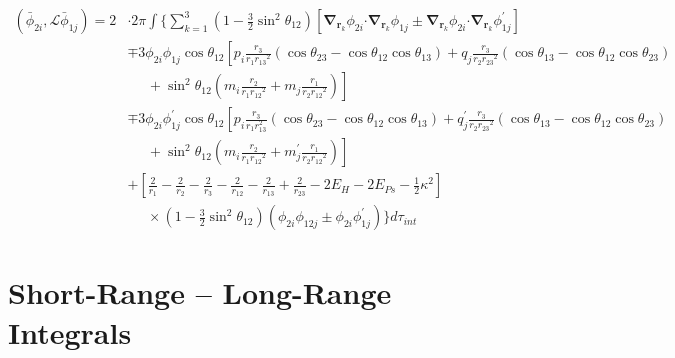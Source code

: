 \documentclass[Dissertation.tex]{subfiles}
\begin{document}
\begin{align}
\label{eq:DWavePhi2Phi1}
\left(\bar{\phi}_{2i},\mathcal{L} \bar{\phi}_{1j}\right) = 2 & \cdot 2\pi \int \Bigg\{ \sum_{k=1}^3 \left(1-\tfrac{3}{2}\sin^2\theta_{12}\right) \left[ \boldsymbol{\nabla}_{\!\mathbf{r}_k} \nonumber \phi_{2i} \boldsymbol{\cdot} \boldsymbol{\nabla}_{\!\mathbf{r}_k} \phi_{1j} \pm \boldsymbol{\nabla}_{\!\mathbf{r}_k} \phi_{2i} \boldsymbol{\cdot} \boldsymbol{\nabla}_{\!\mathbf{r}_k} \phi_{1j}^\prime \right] \\
 \nonumber &\mp 3 \phi_{2i} \phi_{1j} \cos\theta_{12} \left[p_i \frac{r_3}{r_1 {r_{13}}^2} (\cos\theta_{23} - \cos\theta_{12} \cos\theta_{13}) + q_j \frac{r_3}{r_2 {r_{23}}^2}(\cos\theta_{13} - \cos\theta_{12} \cos\theta_{23})\right.\\
 \nonumber & \left. \;\;\;\;\;  + \sin^2\theta_{12} \left(m_i \frac{r_2}{r_1 {r_{12}}^2} + m_j \frac{r_1}{r_2 {r_{12}}^2} \right) \right] \\
 \nonumber &\mp 3 \phi_{2i} \phi_{1j}^\prime \cos\theta_{12} \left[p_i \frac{r_3}{r_1 r_{13}^2} (\cos\theta_{23} - \cos\theta_{12} \cos\theta_{13}) + q_j^\prime \frac{r_3}{r_2 {r_{23}}^2}(\cos\theta_{13} - \cos\theta_{12} \cos\theta_{23})\right.\\
 \nonumber & \left. \;\;\;\;\;  + \sin^2\theta_{12} \left(m_i \frac{r_2}{r_1 {r_{12}}^2} + m_j^\prime \frac{r_1}{r_2 {r_{12}}^2} \right) \right] \\
 \nonumber &+ \left. \left[\frac{2}{r_1} - \frac{2}{r_2} - \frac{2}{r_3} - \frac{2}{r_{12}} - \frac{2}{r_{13}} + \frac{2}{r_{23}} - 2 E_H - 2 E_{Ps} - \frac{1}{2}\kappa^2 \right] \right. \\
 &\;\;\;\;\; \times \left(1-\tfrac{3}{2}\sin^2\theta_{12}\right) \left( \phi_{2i} \phi_{12j} \pm \phi_{2i} \phi_{1j}^\prime \right) \Bigg\} d\tau_{int}
\end{align}




\section{Short-Range -- Long-Range Integrals}
\label{sec:DWaveShortLong}
\end{document}
